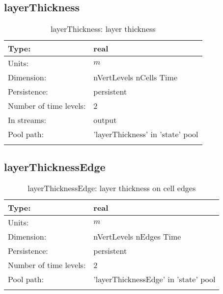 \subsection[layerThickness]{layerThickness}
\label{subsec:var_sec_state_layerThickness}
\begin{center}
\begin{longtable}{| p{2.0in} | p{4.0in} |}
        \hline 
        Type: & real \\
        \hline 
        Units: & $m$ \\
        \hline 
        Dimension: & nVertLevels nCells Time \\
        \hline 
        Persistence: & persistent \\
        \hline 
        Number of time levels: & 2 \\
        \hline 
		 In streams: &  output \\
        \hline 
            Pool path: & 'layerThickness' in 'state' pool
 \\
		 \hline 
    \caption{layerThickness: layer thickness}
\end{longtable}
\end{center}
\subsection[layerThicknessEdge]{layerThicknessEdge}
\label{subsec:var_sec_state_layerThicknessEdge}
\begin{center}
\begin{longtable}{| p{2.0in} | p{4.0in} |}
        \hline 
        Type: & real \\
        \hline 
        Units: & $m$ \\
        \hline 
        Dimension: & nVertLevels nEdges Time \\
        \hline 
        Persistence: & persistent \\
        \hline 
        Number of time levels: & 2 \\
        \hline 
            Pool path: & 'layerThicknessEdge' in 'state' pool
 \\
		 \hline 
    \caption{layerThicknessEdge: layer thickness on cell edges}
\end{longtable}
\end{center}
